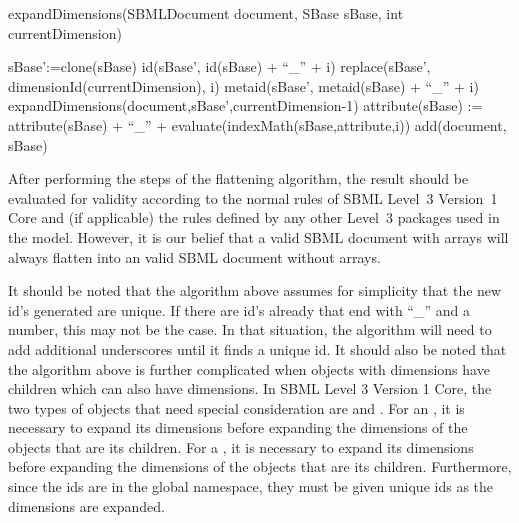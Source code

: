 \begin{algorithm}[ht]
\label{expandDimension}
  \caption{expandDimensions(SBMLDocument document, SBase sBase, int currentDimension)}
       {
                {
                        sBase':=clone(sBase)\;
                        id(sBase', id(sBase) + ``\_'' + i)\;
                        replace(sBase', dimensionId(currentDimension), i)\;
                        metaid(sBase', metaid(sBase) + ``\_'' + i)\;
                        expandDimensions(document,sBase',currentDimension-1)\;
               }
     }
     \Else
     {
                {
                        {
                           attribute(sBase) := attribute(sBase) + ``\_'' + evaluate(indexMath(sBase,attribute,i))\;
                        }
                }
                add(document, sBase)\;
     }
\end{algorithm}

After performing the steps of the flattening algorithm, the result should be evaluated for validity according to the normal rules of SBML Level~3 Version~1 Core and (if applicable) the rules defined by any other Level~3 packages used in the model.  However, it is our belief that a valid SBML document with arrays will always flatten into an valid SBML document without arrays.

It should be noted that the algorithm above assumes for simplicity that the new id's generated are unique.  If there are id's already that end with ``\_'' and a number, this may not be the case.  In that situation, the algorithm will need to add additional underscores until it finds a unique id.  It should also be noted that the algorithm above is further complicated when objects with dimensions have children which can also have dimensions.  In SBML Level 3 Version 1 Core, the two types of objects that need special consideration are \Event and \Reaction.  For an \Event, it is necessary to expand its dimensions before expanding the dimensions of the \EventAssignment objects that are its children.  For a \Reaction, it is necessary to expand its dimensions before expanding the dimensions of the \SpeciesReference objects that are its children.  Furthermore, since the \SpeciesReference ids are in the global namespace, they must be given unique ids as the \Reaction dimensions are expanded.  

